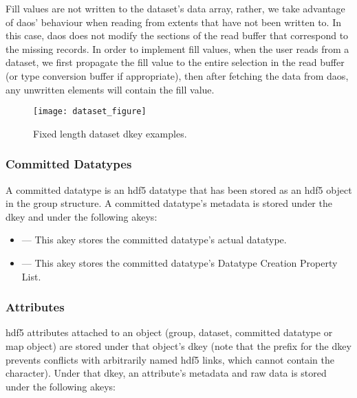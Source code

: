 \documentclass[../design_doc.tex]{subfiles}
\begin{document}
Fill values are not written to the dataset's data array, rather, we take advantage of \acrshort{daos}' behaviour when reading from extents that have not been written to. In this case, \acrshort{daos} does not modify the sections of the read buffer that correspond to the missing records. In order to implement fill values, when the user reads from a dataset, we first propagate the fill value to the entire selection in the read buffer (or type conversion buffer if appropriate), then after fetching the data from \acrshort{daos}, any unwritten elements will contain the fill value.

\begin{figure}
\texttt{[image: dataset\_figure]}
\caption{Fixed length dataset dkey examples.}
\label{fig:dataset}
\end{figure}

\newpage

\subsubsection{Committed Datatypes}

A committed datatype is an \acrshort{hdf5} datatype that has been stored as an \acrshort{hdf5} object in the group structure. A committed datatype's metadata is stored under the  \gls{dkey} and under the following \glspl{akey}:

\begin{itemize}
    \item {} --- This \gls{akey} stores the committed datatype's actual datatype.
    \item {} --- This \gls{akey} stores the committed datatype's Datatype Creation Property List.
\end{itemize}


\newpage

\subsubsection{Attributes}

\acrshort{hdf5} attributes attached to an object (group, dataset, committed datatype or map object) are stored under that object's  \gls{dkey} (note that the \mintcinline{/} prefix for the  \gls{dkey} prevents conflicts with arbitrarily named \acrshort{hdf5} links, which cannot contain the \mintcinline{/} character). Under that \gls{dkey}, an attribute's metadata and raw data is stored under the following \glspl{akey}:
\end{document}
